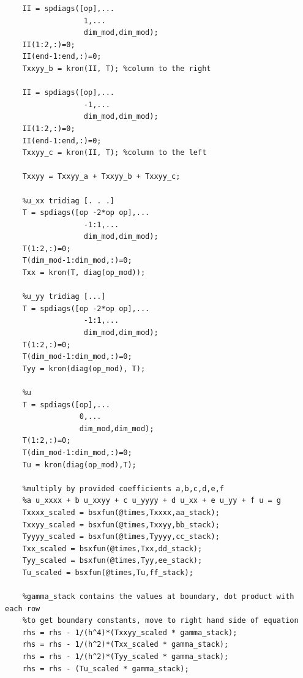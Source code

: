 \documentclass[12pt,letter]{article}
\begin{document}
\begin{enumerate}
\begin{enumerate}
\begin{verbatim}
    II = spdiags([op],...
                  1,...
                  dim_mod,dim_mod);
    II(1:2,:)=0;
    II(end-1:end,:)=0;
    Txxyy_b = kron(II, T); %column to the right

    II = spdiags([op],...
                  -1,...
                  dim_mod,dim_mod);
    II(1:2,:)=0;
    II(end-1:end,:)=0;
    Txxyy_c = kron(II, T); %column to the left

    Txxyy = Txxyy_a + Txxyy_b + Txxyy_c;
    
    %u_xx tridiag [. . .]
    T = spdiags([op -2*op op],...
                  -1:1,...
                  dim_mod,dim_mod);
    T(1:2,:)=0;
    T(dim_mod-1:dim_mod,:)=0;
    Txx = kron(T, diag(op_mod));

    %u_yy tridiag [...]
    T = spdiags([op -2*op op],...
                  -1:1,...
                  dim_mod,dim_mod);
    T(1:2,:)=0;
    T(dim_mod-1:dim_mod,:)=0;
    Tyy = kron(diag(op_mod), T);

    %u
    T = spdiags([op],...
                 0,...
                 dim_mod,dim_mod);
    T(1:2,:)=0;
    T(dim_mod-1:dim_mod,:)=0;
    Tu = kron(diag(op_mod),T);

    %multiply by provided coefficients a,b,c,d,e,f
    %a u_xxxx + b u_xxyy + c u_yyyy + d u_xx + e u_yy + f u = g
    Txxxx_scaled = bsxfun(@times,Txxxx,aa_stack);
    Txxyy_scaled = bsxfun(@times,Txxyy,bb_stack);
    Tyyyy_scaled = bsxfun(@times,Tyyyy,cc_stack);
    Txx_scaled = bsxfun(@times,Txx,dd_stack);
    Tyy_scaled = bsxfun(@times,Tyy,ee_stack);
    Tu_scaled = bsxfun(@times,Tu,ff_stack);
    
    %gamma_stack contains the values at boundary, dot product with each row
    %to get boundary constants, move to right hand side of equation
    rhs = rhs - 1/(h^4)*(Txxyy_scaled * gamma_stack);
    rhs = rhs - 1/(h^2)*(Txx_scaled * gamma_stack);
    rhs = rhs - 1/(h^2)*(Tyy_scaled * gamma_stack);
    rhs = rhs - (Tu_scaled * gamma_stack);
    

\end{verbatim}
\end{enumerate}
\end{enumerate}
\end{document}
